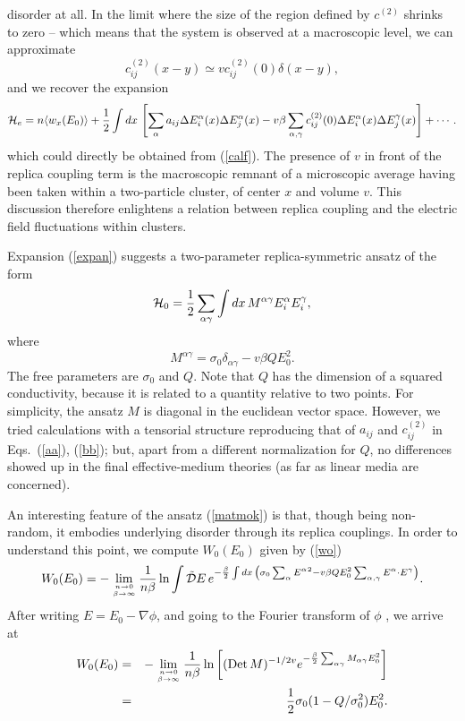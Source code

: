 disorder at all. In the limit where the size of the region defined by
$c^{(2)}$ shrinks to zero -- which means that the system is observed
at a macroscopic level, we can approximate
\begin{equation}
c^{(2)}_{ij}(x-y)\simeq v c^{(2)}_{ij}(0)\delta(x-y),
\end{equation}
and we recover the expansion
\begin{equation}
\label{expan}
{\cal H}_e=n\langle w_x(E_0)\rangle+\frac{1}{2}\int dx\,\left[
\sum_{\alpha}a_{ij}\Delta E^\alpha_i(x)\Delta E^\alpha_j(x)-v\beta
\sum_{\alpha,\gamma}c^{(2)}_{ij}(0)\Delta E^\alpha_i(x)\Delta
E^\gamma_j(x)\right] +\cdots.
\end{equation}
which could directly be obtained from (\ref{calf}). The presence of
$v$ in front of the replica coupling term is the macroscopic remnant
of a microscopic average having been taken within a two-particle
cluster, of center $x$ and volume $v$. This discussion therefore
enlightens a relation between replica coupling and the electric field
fluctuations within clusters.

Expansion (\ref{expan}) suggests a two-parameter 
replica-symmetric ansatz of the form
\begin{equation}
\label{ansatz}
{\cal H}_0=\frac{1}{2} \sum_{\alpha\gamma}\int dx\, M^{\alpha\gamma} 
E^\alpha_i  E^\gamma_i,
\end{equation}
where
\begin{equation}
\label{matmok}
M^{\alpha\gamma}=\sigma_0\delta_{\alpha\gamma}-v\beta Q E_0^2.
\end{equation}
The free parameters are $\sigma_0$ and $Q$. Note that $Q$ has the
dimension of a squared conductivity, because it is related to a
quantity relative to two points. For simplicity, the ansatz $M$ is
diagonal in the euclidean vector space. However, we tried calculations
with a tensorial structure reproducing that of $a_{ij}$ and
$c^{(2)}_{ij}$ in Eqs.\ (\ref{aa}), (\ref{bb}); but, apart from a
different normalization for $Q$, no differences showed up in the final
effective-medium theories (as far as linear media are concerned).

An interesting feature of the ansatz (\ref{matmok}) is that, though 
being non-random, it embodies underlying disorder through its replica 
couplings. In order to understand this point, we compute 
$W_0(E_0)$ given by (\ref{wo})
\begin{equation}
\label{wopath}
W_0(E_0)=-\lim_{n\to 0\atop \beta\to\infty}\frac{1}{n\beta}\ln \int
\tilde{\cal D} E\,e^{-\frac{\beta}{2}\int
dx\,\left(\sigma_0\sum_\alpha{E^\alpha}^2-v\beta Q E_0^2
\sum_{\alpha,\gamma}{E^\alpha}\cdot{E^\gamma}\right)}.
\end{equation}
After writing $E=E_0-\nabla \phi$, and going to the Fourier transform 
of $\phi$ \cite{NOTE2}, we arrive at
\begin{eqnarray}
W_0(E_0)&=&-\lim_{n\to 0\atop \beta\to\infty}\frac{1}{n\beta}\ln
\left[(\mathop{\text{Det}}M)^{-1/2v}
e^{-\frac{\beta}{2}\sum_{\alpha\gamma}
M_{\alpha\gamma}E_0^2}\right]\nonumber\\
\label{wocomp}
&=&\frac{1}{2}\sigma_0(1-Q/\sigma_0^2) E_0^2.
\end{eqnarray}

